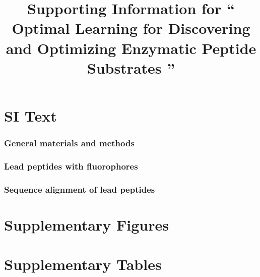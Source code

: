 \documentclass[11pt]{article}
\theoremstyle{remark}
\begin{document}
\title{Supporting Information for \enquote{
 Optimal Learning for Discovering and Optimizing Enzymatic Peptide Substrates 
}}

\maketitle
\tableofcontents
\newpage
\part*{SI Text}
  

\section{General materials and methods}
\section{Lead peptides with fluorophores}
\section{Sequence alignment of lead peptides}
\part{Supplementary Figures}
\part{Supplementary Tables}
  



\end{document}
